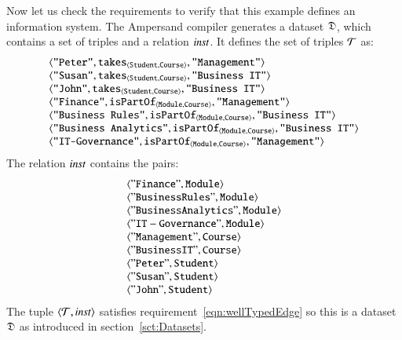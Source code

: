 \documentclass{elsarticle}
\begin{document}
   Now let us check the requirements to verify that this example defines an information system.
   The Ampersand compiler generates a dataset $\mathfrak{D}$, which contains a set of triples and a relation $\text{\it inst\/}$.
   It defines the set of triples $\mathcal{T}$ as:
   \[\begin{array}[t]{l}
         \langle{\text{\tt "Peter"}},{\text{\it \text{\tt takes}\/}_{\langle{\text{\tt Student}},{\text{\tt Course}}\rangle}},{\text{\tt "Management"}}\rangle\\
         \langle{\text{\tt "Susan"}},{\text{\it \text{\tt takes}\/}_{\langle{\text{\tt Student}},{\text{\tt Course}}\rangle}},{\text{\tt "Business IT"}}\rangle\\
         \langle{\text{\tt "John"}},{\text{\it \text{\tt takes}\/}_{\langle{\text{\tt Student}},{\text{\tt Course}}\rangle}},{\text{\tt "Business IT"}}\rangle\\
         \langle{\text{\tt "Finance"}},{\text{\it \text{\tt isPartOf}\/}_{\langle{\text{\tt Module}},{\text{\tt Course}}\rangle}},{\text{\tt "Management"}}\rangle\\
         \langle{\text{\tt "Business Rules"}},{\text{\it \text{\tt isPartOf}\/}_{\langle{\text{\tt Module}},{\text{\tt Course}}\rangle}},{\text{\tt "Business IT"}}\rangle\\
         \langle{\text{\tt "Business Analytics"}},{\text{\it \text{\tt isPartOf}\/}_{\langle{\text{\tt Module}},{\text{\tt Course}}\rangle}},{\text{\tt "Business IT"}}\rangle\\
         \langle{\text{\tt "IT-Governance"}},{\text{\it \text{\tt isPartOf}\/}_{\langle{\text{\tt Module}},{\text{\tt Course}}\rangle}},{\text{\tt "Management"}}\rangle
   \end{array}\]
   The relation $\text{\it inst\/}$ contains the pairs:
   \[\begin{array}{l}
      \langle{\tt "Finance"},{\tt Module}\rangle\\
      \langle{\tt "Business Rules"},{\tt Module}\rangle\\
      \langle{\tt "Business Analytics"},{\tt Module}\rangle\\
      \langle{\tt "IT-Governance"},{\tt Module}\rangle\\
      \langle{\tt "Management"},{\tt Course}\rangle\\
      \langle{\tt "Business IT"},{\tt Course}\rangle\\
      \langle{\tt "Peter"},{\tt Student}\rangle\\
      \langle{\tt "Susan"},{\tt Student}\rangle\\
      \langle{\tt "John"},{\tt Student}\rangle
   \end{array}\]
   The tuple $\langle{\mathcal{T}},{\text{\it inst\/}}\rangle$ satisfies requirement~\ref{eqn:wellTypedEdge} so this is a dataset $\mathfrak{D}$ as introduced in section~\ref{sct:Datasets}.
\end{document}
